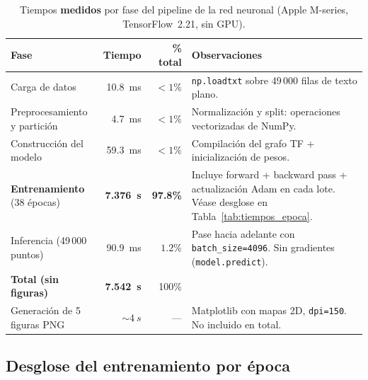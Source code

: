 \documentclass[12pt,a4paper]{article}
\begin{document}
\begin{table}[H]
\centering
\caption{Tiempos \textbf{medidos} por fase del pipeline de la red neuronal
         (Apple M-series, TensorFlow~2.21, sin GPU).}
\label{tab:tiempos_rn}
\begin{tabular}{lrrp{5.5cm}}
\toprule
Fase & Tiempo & \% total & Observaciones \\
\midrule
Carga de datos
  & \SI{10.8}{ms} & $< 1\%$
  & \texttt{np.loadtxt} sobre 49\,000 filas de texto plano. \\[4pt]
Preprocesamiento y partición
  & \SI{4.7}{ms} & $< 1\%$
  & Normalización y split: operaciones vectorizadas de NumPy. \\[4pt]
Construcción del modelo
  & \SI{59.3}{ms} & $< 1\%$
  & Compilación del grafo TF + inicialización de pesos. \\[4pt]
\textbf{Entrenamiento} (38 épocas)
  & \textbf{\SI{7.376}{s}} & \textbf{97.8\%}
  & Incluye forward + backward pass + actualización Adam en
    cada lote. Véase desglose en Tabla~\ref{tab:tiempos_epoca}. \\[4pt]
Inferencia (49\,000 puntos)
  & \SI{90.9}{ms} & $1.2\%$
  & Pase hacia adelante con \texttt{batch\_size=4096}.
    Sin gradientes (\texttt{model.predict}). \\[4pt]
\midrule
\textbf{Total (sin figuras)} & \textbf{\SI{7.542}{s}} & 100\% & \\
\midrule
Generación de 5 figuras PNG
  & $\sim\SI{4}{s}$ & ---
  & Matplotlib con mapas 2D, \texttt{dpi=150}. No incluido en total. \\
\bottomrule
\end{tabular}
\end{table}

\subsection{Desglose del entrenamiento por época}
\end{document}
